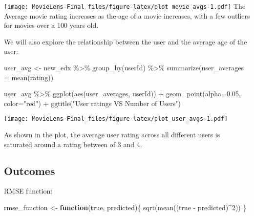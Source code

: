 \documentclass[
]{article}
\newenvironment{Shaded}{\begin{snugshade}}{\end{snugshade}}
\newcommand{\AttributeTok}[1]{\textcolor[rgb]{0.77,0.63,0.00}{#1}}
\newcommand{\ControlFlowTok}[1]{\textcolor[rgb]{0.13,0.29,0.53}{\textbf{#1}}}
\newcommand{\DecValTok}[1]{\textcolor[rgb]{0.00,0.00,0.81}{#1}}
\newcommand{\FloatTok}[1]{\textcolor[rgb]{0.00,0.00,0.81}{#1}}
\newcommand{\FunctionTok}[1]{\textcolor[rgb]{0.00,0.00,0.00}{#1}}
\newcommand{\NormalTok}[1]{#1}
\newcommand{\OtherTok}[1]{\textcolor[rgb]{0.56,0.35,0.01}{#1}}
\newcommand{\SpecialCharTok}[1]{\textcolor[rgb]{0.00,0.00,0.00}{#1}}
\newcommand{\StringTok}[1]{\textcolor[rgb]{0.31,0.60,0.02}{#1}}
\begin{document}
\texttt{[image: MovieLens-Final\_files/figure-latex/plot\_movie\_avgs-1.pdf]}
The Average movie rating increases as the age of a movie increases, with
a few outliers for movies over a 100 years old.

We will also explore the relationship between the user and the average
age of the user:

\begin{Shaded}
\begin{Highlighting}[]
\NormalTok{user\_avg }\OtherTok{\textless{}{-}}\NormalTok{ new\_edx }\SpecialCharTok{\%\textgreater{}\%} \FunctionTok{group\_by}\NormalTok{(userId) }\SpecialCharTok{\%\textgreater{}\%} \FunctionTok{summarize}\NormalTok{(}\AttributeTok{user\_averages =} \FunctionTok{mean}\NormalTok{(rating))}
\end{Highlighting}
\end{Shaded}

\begin{Shaded}
\begin{Highlighting}[]
\NormalTok{user\_avg }\SpecialCharTok{\%\textgreater{}\%}
  \FunctionTok{ggplot}\NormalTok{(}\FunctionTok{aes}\NormalTok{(user\_averages, userId)) }\SpecialCharTok{+}
  \FunctionTok{geom\_point}\NormalTok{(}\AttributeTok{alpha=}\FloatTok{0.05}\NormalTok{, }\AttributeTok{color=}\StringTok{"red"}\NormalTok{) }\SpecialCharTok{+}
  \FunctionTok{ggtitle}\NormalTok{(}\StringTok{"User ratings VS Number of Users"}\NormalTok{)}
\end{Highlighting}
\end{Shaded}

\texttt{[image: MovieLens-Final\_files/figure-latex/plot\_user\_avgs-1.pdf]}

As shown in the plot, the average user rating across all different users
is saturated around a rating between of 3 and 4.

\hypertarget{outcomes}{%
\subsection{Outcomes}\label{outcomes}}

RMSE function:

\begin{Shaded}
\begin{Highlighting}[]
\NormalTok{rmse\_function }\OtherTok{\textless{}{-}} \ControlFlowTok{function}\NormalTok{(true, predicted)\{}
  \FunctionTok{sqrt}\NormalTok{(}\FunctionTok{mean}\NormalTok{((true }\SpecialCharTok{{-}}\NormalTok{ predicted)}\SpecialCharTok{\^{}}\DecValTok{2}\NormalTok{))}
\NormalTok{\}}
\end{Highlighting}
\end{Shaded}
\end{document}

